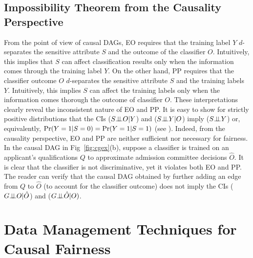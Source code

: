 \documentclass[11pt]{article}
\begin{document}
\subsection{Impossibility Theorem from the Causality Perspective}
\label{sec:imposib}
From the point of view of causal DAGs, EO requires that the training label $Y$
$d$-separates the sensitive attribute $S$ and the outcome of the classifier $O$. Intuitively, this implies that $S$ can affect classification results only when the information comes through the training label $Y$. On the other hand, PP requires that the classifier outcome $O$ $d$-separates the sensitive attribute $S$ and the training labels $Y$. Intuitively, this implies $S$ can affect the training labels only when the information comes thorough the outcome of classifier $O$. These interpretations clearly reveal the inconsistent nature of EO and PP. It is easy to show for strictly positive distributions that the CIs ($S \mbox{$\perp\!\!\!\perp$} O| Y$) and  ($S \mbox{$\perp\!\!\!\perp$} Y| O$) imply ($S \mbox{$\perp\!\!\!\perp$} Y$) %
or, equivalently,  ${\tt \mathrm{Pr}}(Y=1|S=0) = {\tt \mathrm{Pr}}(Y=1|S=1)$ (see \cite{salimi2019interventional}).  Indeed, from the causality perspective, EO and PP are neither sufficient nor necessary for fairness. In the causal DAG in Fig~\ref{fig:cgex}(b), suppose a classifier is trained on an applicant's qualifications $Q$ to approximate admission committee decisions $\hat{O}$.  It is clear that the classifier is not discriminative, yet it violates both EO and PP. The reader can verify that the causal DAG obtained by further adding an edge from $Q$ to $\hat{O}$ (to account for the classifier outcome) does not imply the CIs ($G \mbox{$\perp\!\!\!\perp$} O| \hat{O}$) and ($G \mbox{$\perp\!\!\!\perp$} \hat{O}| O)$.
\vspace{-0.3cm}
\section{Data Management Techniques for Causal Fairness}
\label{sec:dmandfairness}
\vspace{-0.1cm}
\end{document}
